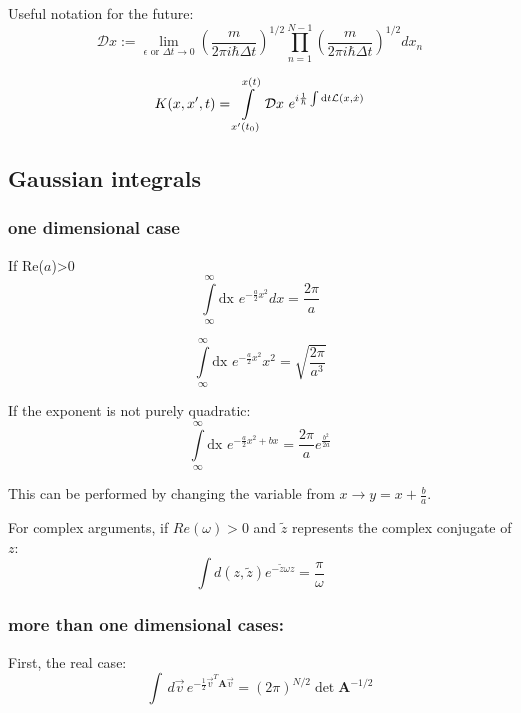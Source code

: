 \documentclass[12pt,a4paper]{article}
\numberwithin{equation}{section}
\begin{document}
Useful notation for the future:
\begin{equation}\label{1:39}
\mathcal{D}x := \lim_{\epsilon\text{ or } \Delta t \rightarrow 0} \left( \frac{m}{2 \pi i \hbar \Delta t}\right)^{1/2} \prod\limits_{n=1}^{N-1} \left( \frac{m}{2 \pi i \hbar \Delta t}\right)^{1/2} dx_n
\end{equation}


\begin{equation}
K(x,x^\prime,t) = \int\limits_{x^\prime (t_0)}^{x(t)} \mathcal{D}x \,\, e^{i\frac{1}{\hbar} \int {\rm{d}}t \mathcal{L}(x,\dot{x})}
\end{equation}





\subsection{Gaussian integrals}

\subsubsection{one dimensional case}
If Re($a$)>0
\begin{equation}
\int\limits_\infty^\infty \text{dx } e^{-\frac{a}{2} x^2} dx= \frac{2 \pi}{a}
\end{equation}

\begin{equation}
\int\limits_\infty^\infty \text{dx } e^{-\frac{a}{2} x^2} x^2 = \sqrt{\frac{2 \pi}{a^3}}
\end{equation}

If the exponent is not purely quadratic:
\begin{equation}
\int\limits_\infty^\infty \text{dx } e^{-\frac{a}{2}x^2 + bx} = \frac{2\pi}{a} e^{\frac{b^2}{2a}}
\end{equation}

This can be performed by changing the variable from $x \rightarrow y = x + \frac{b}{a}$.

For complex arguments, if $Re(\omega) >0$ and $\tilde{z}$ represents the complex conjugate of $z$:
\begin{equation}
\int d(z,\tilde{z}) e^{-\tilde{z}\omega z} = \frac{\pi}{\omega}
\end{equation}

\subsubsection{more than one dimensional cases:}
First, the real case:
\begin{equation}
\int \,d\vec{v}\, e^{-\frac{1}{2}\vec{v}^T \textbf{A} \vec{v}} = (2\pi)^{N/2} \det\textbf{A}^{-1/2}
\end{equation}
\end{document}
